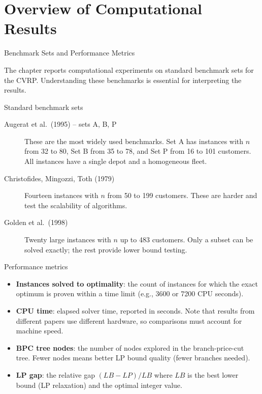 \documentclass[aspectratio=169,10pt]{beamer}
\begin{document}
\section{Overview of Computational Results}

\begin{frame}[allowframebreaks]{Benchmark Sets and Performance Metrics}

The chapter reports computational experiments on standard benchmark
sets for the CVRP. Understanding these benchmarks is essential for
interpreting the results.

\begin{block}{Standard benchmark sets}
\begin{description}
  \item[Augerat et al.\ (1995) -- sets A, B, P]
        These are the most widely used benchmarks. Set A has instances
        with $n$ from 32 to 80, Set B from 35 to 78, and Set P from
        16 to 101 customers. All instances have a single depot and
        a homogeneous fleet.
  \item[Christofides, Mingozzi, Toth (1979)]
        Fourteen instances with $n$ from 50 to 199 customers. These
        are harder and test the scalability of algorithms.
  \item[Golden et al.\ (1998)]
        Twenty large instances with $n$ up to 483 customers. Only a
        subset can be solved exactly; the rest provide lower bound
        testing.
\end{description}
\end{block}

\framebreak

\begin{block}{Performance metrics}
\begin{itemize}
  \item \textbf{Instances solved to optimality}: the count of instances
        for which the exact optimum is proven within a time limit (e.g.,
        3600 or 7200 CPU seconds).
  \item \textbf{CPU time}: elapsed solver time, reported in seconds.
        Note that results from different papers use different hardware,
        so comparisons must account for machine speed.
  \item \textbf{BPC tree nodes}: the number of nodes explored in the
        branch-price-cut tree. Fewer nodes means better LP bound quality
        (fewer branches needed).
  \item \textbf{LP gap}: the relative gap $(LB - LP) / LB$ where $LB$
        is the best lower bound (LP relaxation) and the optimal integer
        value.
\end{itemize}
\end{block}

\end{frame}
\end{document}
